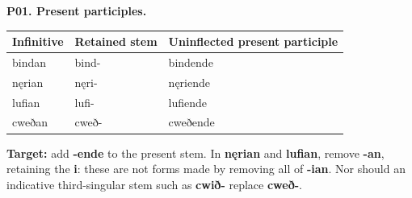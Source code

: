 \par\begin{minipage}{\linewidth}\raggedright
\textbf{P01. Present participles.}

\par\begingroup
\fontsize{10.5}{13.2}\selectfont
\setlength{\LTleft}{0pt}\setlength{\LTright}{\fill}
\noindent
\begin{tabular}{@{}>{\raggedright\arraybackslash}p{29.74mm}>{\raggedright\arraybackslash}p{30.49mm}>{\raggedright\arraybackslash}p{58.15mm}@{}}
\toprule
\textbf{Infinitive} & \textbf{Retained stem} & \textbf{Uninflected present participle} \\
\midrule
bindan & bind- & bindende \\
nęrian & nęri- & nęriende \\
lufian & lufi- & lufiende \\
cweðan & cweð- & cweðende \\
\bottomrule
\end{tabular}
\par\endgroup

\textbf{Target:} add \textbf{-ende} to the present stem. In \textbf{nęrian} and \textbf{lufian}, remove \textbf{-an}, retaining the \textbf{i}: these are not forms made by removing all of \textbf{-ian}. Nor should an indicative third-singular stem such as \textbf{cwið-} replace \textbf{cweð-}.

\end{minipage}\par\addvspace{4pt}


